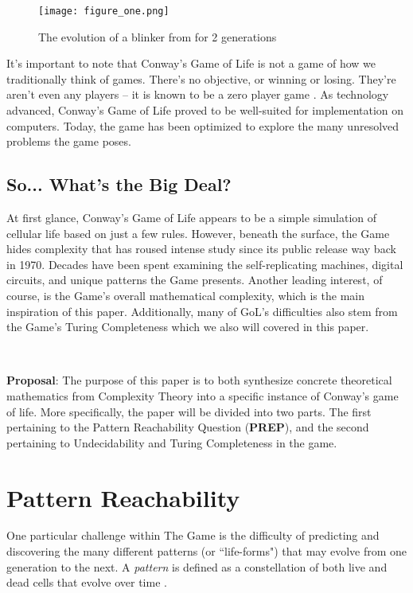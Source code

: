 \documentclass{article}
\theoremstyle{definition}
\theoremstyle{plain}
\theoremstyle{plain}
\begin{document}
 \begin{figure}[ht]
          \centering
    \texttt{[image: figure\_one.png]}
    \caption{The evolution of a blinker from for 2 generations}
    \label{figure_one}
    \cite{Bontes2019}
\end{figure}

It’s important to note that Conway’s Game of Life is not a game of how we traditionally think of games. There’s no objective, or winning or losing. They’re aren’t even any players – it is known to be a zero player game \cite{Beginning_Life_2006}. As technology advanced, Conway’s Game of Life proved to be well-suited for implementation on computers. Today, the game has been optimized to explore the many unresolved problems the game poses. 

\subsection{So... What's the Big Deal?}

At first glance, Conway’s Game of Life appears to be a simple simulation of cellular life based on just a few rules. However, beneath the surface, the Game hides complexity that has roused intense study since its public release way back in 1970. Decades have been spent examining the self-replicating machines, digital circuits, and unique patterns the Game presents. Another leading interest, of course, is the Game's overall mathematical complexity, which is the main inspiration of this paper. Additionally, many of GoL's difficulties also stem from the Game's Turing Completeness which we also will covered in this paper. 

\ 

\textbf{Proposal}: The purpose of this paper is to both synthesize concrete theoretical mathematics from Complexity Theory into a specific instance of Conway's game of life. More specifically, the paper will be divided into two parts. The first pertaining to the Pattern Reachability Question (\textbf{PREP}), and the second pertaining to Undecidability and Turing Completeness in the game.

\section {Pattern Reachability}
\label{patterns}
One particular challenge within The Game is the difficulty of predicting and discovering the many different patterns (or ``life-forms") that may evolve from one generation to the next. A\textit{ pattern} is defined as a constellation of both live and dead cells that evolve over time \cite{Bontes2019}.
\end{document}
